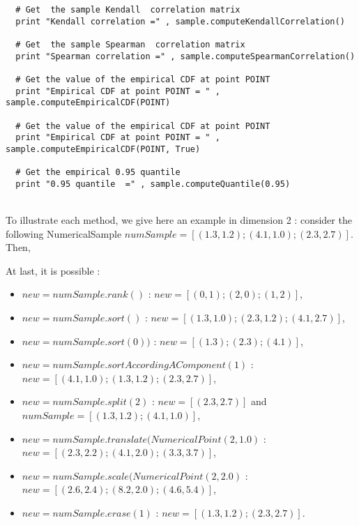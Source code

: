 \begin{lstlisting}
  # Get  the sample Kendall  correlation matrix
  print "Kendall correlation =" , sample.computeKendallCorrelation()

  # Get  the sample Spearman  correlation matrix
  print "Spearman correlation =" , sample.computeSpearmanCorrelation()

  # Get the value of the empirical CDF at point POINT
  print "Empirical CDF at point POINT = " , sample.computeEmpiricalCDF(POINT)

  # Get the value of the empirical CDF at point POINT
  print "Empirical CDF at point POINT = " , sample.computeEmpiricalCDF(POINT, True)

  # Get the empirical 0.95 quantile
  print "0.95 quantile  =" , sample.computeQuantile(0.95)
\end{lstlisting}
\textspace\\



To illustrate each method, we give here an example in dimension 2 : consider the following NumericalSample $numSample = [(1.3, 1.2); (4.1, 1.0); (2.3, 2.7)]$. Then,

At last, it is possible :
\begin{itemize}
\item $new = numSample.rank()$ : $new = [(0,1); (2,0); (1,2)]$,
\item $new = numSample.sort()$ : $new = [(1.3,1.0); (2.3,1.2); (4.1,2.7)]$,
\item $new = numSample.sort(0))$ : $new = [(1.3); (2.3); (4.1)]$,
\item $new = numSample.sortAccordingAComponent(1)$ : $new  = [(4.1, 1.0);(1.3, 1.2);(2.3, 2.7)]$,
\item $new = numSample.split(2)$ : $new  = [(2.3, 2.7)]$ and $numSample = [(1.3, 1.2); (4.1, 1.0)]$,
\item $new = numSample.translate(NumericalPoint(2,1.0) $ : $new  = [(2.3, 2.2); (4.1, 2.0); (3.3, 3.7)]$,
\item $new = numSample.scale(NumericalPoint(2,2.0) $ : $new  = [(2.6, 2.4); (8.2, 2.0); (4.6, 5.4)]$,
\item $new = numSample.erase(1) $ : $new  = [(1.3, 1.2); (2.3, 2.7)]$.
\end{itemize}
